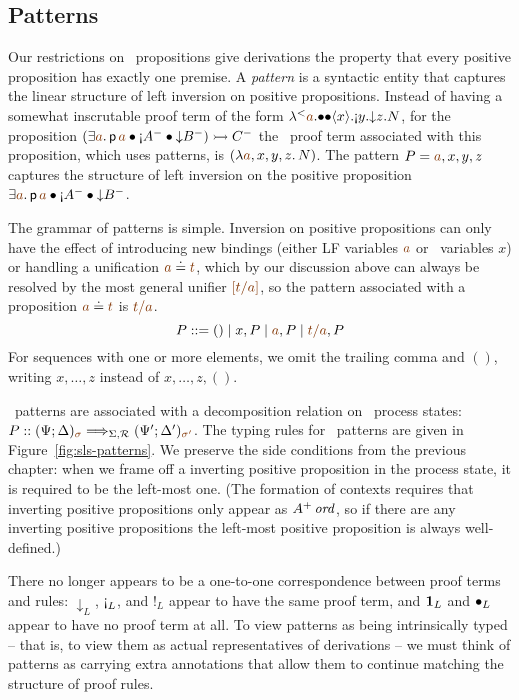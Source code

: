 \subsection{Patterns}
\label{sec:framework-patterns}

Our restrictions on \sls~propositions give derivations the property
that every positive proposition has exactly one premise. A {\it
  pattern} is a syntactic entity that captures the linear structure of
left inversion on positive propositions. Instead of having a somewhat
inscrutable proof term of the form
${\tlaml{\texistsl{\lf{a}}
   {\tfusel{\tfusel{\tetap{x}{\tgnabl{y}{\tdownl{z}{N}}}}}}}}$,
for the proposition 
%
$(\exists \lf{a}.\,{\sf p}\,\lf{a} 
             \fuse {\gnab}A^-
             \fuse {\downarrow}B^-) \lefti C^-$
%
the \sls~proof term associated with this proposition, which uses patterns, is
$(\lambda \lf{a},x,y,z.\, N)$. The pattern $P = \lf{a}, x,y,z$ captures
the structure of left inversion on the positive proposition 
$\exists \lf{a}.\,{\sf p}\,\lf{a} 
             \fuse {\gnab}A^-
             \fuse {\downarrow}B^-$.

The grammar of patterns is simple.
% 
Inversion on positive propositions
can only have the effect of introducing new bindings (either LF
variables $\lf{a}$ or \sls~variables $x$) or handling a unification
$\lf{a} \doteq \lf{t}$, which by our discussion above can always be
resolved by the most general unifier $\lf{[t/a]}$, so the pattern associated
with a proposition $\lf{a} \doteq \lf{t}$ is $\lf{t/a}$. 
\[
P ::= () \mid x, P \mid \lf{a}, P \mid \lf{t/a}, P
\] 
For sequences with one or more elements, we omit the trailing
comma and $()$, writing $x, \ldots, z$ 
instead of $x, \ldots, z, ()$. 

\sls~patterns are associated with a decomposition relation on
\sls~process states: $P :: (\Psi; \Delta)_{\lf{\sigma}}
\Longrightarrow_{\Sigma,\subord} (\Psi'; \Delta')_{\lf{\sigma'}}$.
The typing rules for \sls~patterns are given in
Figure~\ref{fig:sls-patterns}. We preserve the side conditions from
the previous chapter: when we frame off a inverting positive
proposition in the process state, it is required to be the left-most
one. (The formation of contexts requires that inverting positive
propositions only appear as ${A^+}\,{{\it ord}}$, so if there are any inverting
positive propositions the left-most positive proposition is always
well-defined.)

There no longer appears to be a one-to-one correspondence between
proof terms and rules: ${\downarrow}_L$, ${\gnab}_L$, and ${!}_L$
appear to have the same proof term, and ${\mathbf{1}}_L$ and ${\mathbin{\bullet}}_L$
appear to have no proof term at all. To view patterns as being
intrinsically typed -- that is, to view them as actual representatives
of derivations -- we must think of patterns as carrying extra
annotations that allow them to continue matching the structure of
proof rules.

